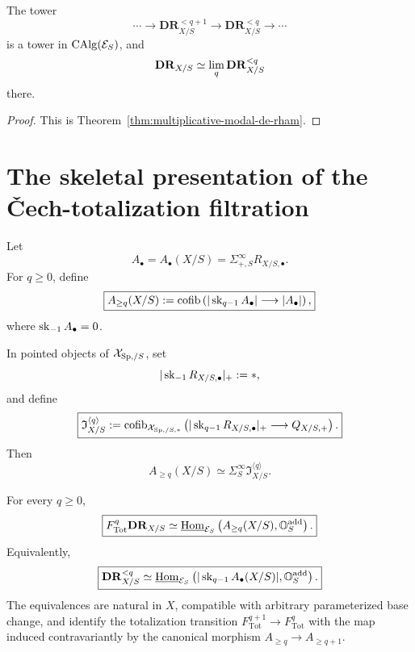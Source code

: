 \begin{proposition}
\label{prop:lax-monoidal-coherent-totalization}
The tower
\[
    \cdots\longrightarrow
    \mathbf{DR}_{X/S}^{<q+1}
    \longrightarrow
    \mathbf{DR}_{X/S}^{<q}
    \longrightarrow\cdots
\]
is a tower in \(\operatorname{CAlg}(\mathcal E_S)\), and
\[
    \mathbf{DR}_{X/S}
    \simeq
    \operatorname*{lim}_q\mathbf{DR}_{X/S}^{<q}
\]
there.
\end{proposition}

\begin{proof}
This is Theorem~\ref{thm:multiplicative-modal-de-rham}.
\end{proof}


\section{The skeletal presentation of the \v{C}ech-totalization filtration}
\label{sec:skeletal-hodge-filtration}

\begin{construction}
\label{constr:modal-skeletal-quotients}
Let
\[
    A_\bullet=A_\bullet(X/S)
    =
    \Sigma^\infty_{+,S}R_{X/S,\bullet}.
\]
For \(q\geq0\), define
\[
\boxed{
    A_{\geq q}(X/S)
    :=
    \operatorname{cofib}
    \left(
        |\operatorname{sk}_{q-1}A_\bullet|
        \longrightarrow
        |A_\bullet|
    \right),
}
\]
where \(\operatorname{sk}_{-1}A_\bullet=0\).

In pointed objects of \(\mathcal X_{\mathrm{Sp},/S}\), set
\[
    |\operatorname{sk}_{-1}R_{X/S,\bullet}|_+:=*,
\]
and define
\[
\boxed{
    \mathfrak I^{\langle q\rangle}_{X/S}
    :=
    \operatorname{cofib}_{\mathcal X_{\mathrm{Sp},/S,*}}
    \left(
        |\operatorname{sk}_{q-1}R_{X/S,\bullet}|_+
        \longrightarrow
        Q_{X/S,+}
    \right).
}
\]
Then
\[
\boxed{
    A_{\geq q}(X/S)
    \simeq
    \Sigma^\infty_S
    \mathfrak I^{\langle q\rangle}_{X/S}.
}
\]
\end{construction}

\begin{theorem}
\label{thm:skeletal-hodge-presentation}
For every \(q\geq0\),
\[
\boxed{
    F_{\mathrm{Tot}}^q\mathbf{DR}_{X/S}
    \simeq
    \underline{\operatorname{Hom}}_{\mathcal E_S}
    \left(
        A_{\geq q}(X/S),
        \mathbb O_S^{\mathrm{add}}
    \right).
}
\]
Equivalently,
\[
\boxed{
    \mathbf{DR}_{X/S}^{<q}
    \simeq
    \underline{\operatorname{Hom}}_{\mathcal E_S}
    \left(
        |\operatorname{sk}_{q-1}A_\bullet(X/S)|,
        \mathbb O_S^{\mathrm{add}}
    \right).
}
\]
The equivalences are natural in \(X\), compatible with arbitrary parameterized base change, and
identify the totalization transition \(F_{\mathrm{Tot}}^{q+1}\to F_{\mathrm{Tot}}^q\) with the map induced contravariantly by the
canonical morphism \(A_{\geq q}\to A_{\geq q+1}\).
\end{theorem}

